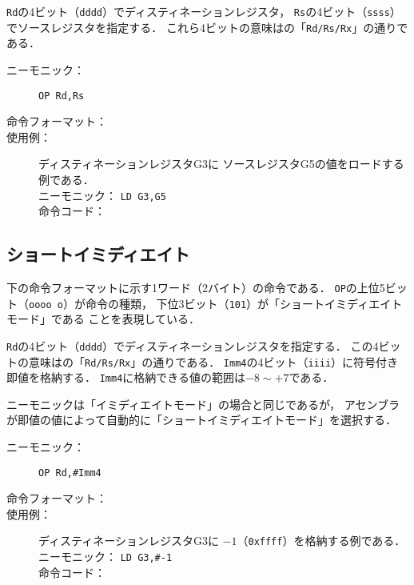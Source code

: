 \texttt{Rd}の4ビット（\texttt{dddd}）でディスティネーションレジスタ，
\texttt{Rs}の4ビット（\texttt{ssss}）でソースレジスタを指定する．
これら4ビットの意味はの「\texttt{Rd/Rs/Rx}」の通りである．

\begin{description}
\item[ニーモニック：] \texttt{OP Rd,Rs}

\item[命令フォーマット：] %

\item[使用例：] ディスティネーションレジスタG3に
ソースレジスタG5の値をロードする例である． \\
ニーモニック： \texttt{LD G3,G5}\\
命令コード：
\end{description}

\subsection{ショートイミディエイト}
下の命令フォーマットに示す1ワード（2バイト）の命令である．
\texttt{OP}の上位5ビット（\texttt{oooo o}）が命令の種類，
下位3ビット（\texttt{101}）が「ショートイミディエイトモード」である
ことを表現している．

\texttt{Rd}の4ビット（\texttt{dddd}）でディスティネーションレジスタを指定する．
この4ビットの意味はの「\texttt{Rd/Rs/Rx}」の通りである．
\texttt{Imm4}の4ビット（\texttt{iiii}）に符号付き即値を格納する．
\texttt{Imm4}に格納できる値の範囲は$-8 \sim +7$である．

ニーモニックは「イミディエイトモード」の場合と同じであるが，
アセンブラが即値の値によって自動的に「ショートイミディエイトモード」を選択する．

\begin{description}
\item[ニーモニック：] \texttt{OP Rd,\#Imm4}

\item[命令フォーマット：] %

\item[使用例：] ディスティネーションレジスタG3に
$-1$（\texttt{0xffff}）を格納する例である．\\
ニーモニック： \texttt{LD G3,\#-1}\\
命令コード：
\end{description}

